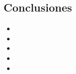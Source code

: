 \subsection{Conclusiones}

\begin{itemize}
    \item \lipsum[1]
    \item \lipsum[2]
    \item \lipsum[3]
    \item \lipsum[4]
    \item \lipsum[5]
\end{itemize}